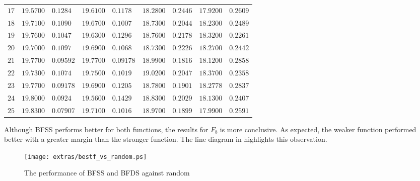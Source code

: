 \begin{table}[ht!]
\begin{tabular}{|r|r@{$\,\pm\,$}l
											|r@{$\,\pm\,$}l
											|r@{$\,\pm\,$}l
											|r@{$\,\pm\,$}l|}
  $ 17 $  &  $ 19.5700 $  &  $ 0.1284 $  &  $ 19.6100 $  &  $ 0.1178 $  &  $ 18.2800 $  &  $ 0.2446 $  &  $ 17.9200 $  &  $ 0.2609 $ \\
  $ 18 $  &  $ 19.7100 $  &  $ 0.1090 $  &  $ 19.6700 $  &  $ 0.1007 $  &  $ 18.7300 $  &  $ 0.2044 $  &  $ 18.2300 $  &  $ 0.2489 $ \\
  $ 19 $  &  $ 19.7600 $  &  $ 0.1047 $  &  $ 19.6300 $  &  $ 0.1296 $  &  $ 18.7600 $  &  $ 0.2178 $  &  $ 18.3200 $  &  $ 0.2261 $ \\
  $ 20 $  &  $ 19.7000 $  &  $ 0.1097 $  &  $ 19.6900 $  &  $ 0.1068 $  &  $ 18.7300 $  &  $ 0.2226 $  &  $ 18.2700 $  &  $ 0.2442 $ \\
  $ 21 $  &  $ 19.7700 $  &  $ 0.09592 $  &  $ 19.7700 $  &  $ 0.09178 $  &  $ 18.9900 $  &  $ 0.1816 $  &  $ 18.1200 $  &  $ 0.2858 $ \\
  $ 22 $  &  $ 19.7300 $  &  $ 0.1074 $  &  $ 19.7500 $  &  $ 0.1019 $  &  $ 19.0200 $  &  $ 0.2047 $  &  $ 18.3700 $  &  $ 0.2358 $ \\
  $ 23 $  &  $ 19.7700 $  &  $ 0.09178 $  &  $ 19.6900 $  &  $ 0.1205 $  &  $ 18.7800 $  &  $ 0.1901 $  &  $ 18.2778 $  &  $ 0.2837 $ \\
  $ 24 $  &  $ 19.8000 $  &  $ 0.0924 $  &  $ 19.5600 $  &  $ 0.1429 $  &  $ 18.8300 $  &  $ 0.2029 $  &  $ 18.1300 $  &  $ 0.2407 $ \\
  $ 25 $  &  $ 19.8300 $  &  $ 0.07907 $  &  $ 19.7100 $  &  $ 0.1016 $  &  $ 18.9700 $  &  $ 0.1899 $  &  $ 17.9900 $  &  $ 0.2591 $ \\
\hline
		\end{tabular}
	\label{tab:tree-bfss-random}
\end{table}
\newpage
Although BFSS performs better for both functions, the results for $F_b$ is more conclusive.  As expected, the weaker function performed better with a greater margin than the stronger function.  The line diagram in  highlights this observation.
\newpage
\begin{figure}[!ht]
	\centering
		\texttt{[image: extras/bestf\_vs\_random.ps]}
	\caption{The performance of BFSS and BFDS against random}
	\label{fig:tree-bffs-random}
\end{figure}


